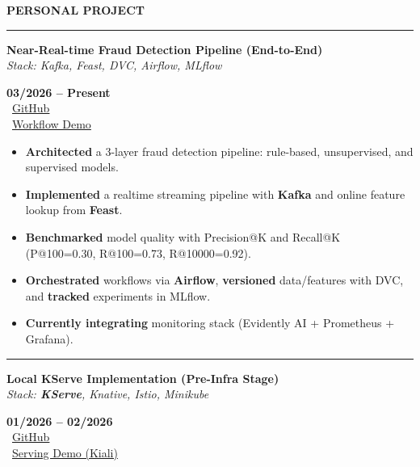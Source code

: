 \documentclass[a4paper,10pt]{extarticle}
\begin{document}
\vspace{2pt}

\noindent\textbf{PERSONAL PROJECT}\par\vspace{1pt}\hrule\vspace{2pt}
\noindent
\begin{minipage}[t]{0.73\textwidth}
    \textbf{Near-Real-time Fraud Detection Pipeline (End-to-End)} \\
    \textit{Stack: Kafka, Feast, DVC, Airflow, MLflow}
\end{minipage}
\hfill
\begin{minipage}[t]{0.24\textwidth}
    \begin{flushright}
    \small
    \textbf{03/2026 -- Present} \\
    \faGithub\ \href{https://github.com/tandat8896/fraud_rt_projects}{GitHub} \\
    \faYoutube\ \href{https://www.youtube.com/watch?v=AtsQwF9pSVg&list=PLRkwChN4lOmfjJLMB9fVPjxvJeA0QUNti}{Workflow Demo}
    \end{flushright}
\end{minipage}

\begin{itemize}
    \item \textbf{Architected} a 3-layer fraud detection pipeline: rule-based, unsupervised, and supervised models.
    \item \textbf{Implemented} a realtime streaming pipeline with \textbf{Kafka} and online feature lookup from \textbf{Feast}.
    \item \textbf{Benchmarked} model quality with Precision@K and Recall@K (P@100=0.30, R@100=0.73, R@10000=0.92).
    \item \textbf{Orchestrated} workflows via \textbf{Airflow}, \textbf{versioned} data/features with DVC, and \textbf{tracked} experiments in MLflow.
    \item \textbf{Currently integrating} monitoring stack (Evidently AI + Prometheus + Grafana).
\end{itemize}

\vspace{1pt}\hrule\vspace{2pt}
\noindent
\begin{minipage}[t]{0.73\textwidth}
    \textbf{Local KServe Implementation (Pre-Infra Stage)} \\
    \textit{Stack: \textbf{KServe}, Knative, Istio, Minikube}
\end{minipage}
\hfill
\begin{minipage}[t]{0.24\textwidth}
    \begin{flushright}
    \small
    \textbf{01/2026 -- 02/2026} \\
    \faGithub\ \href{https://github.com/tandat8896/sales-forecasting-end-to-end}{GitHub} \\
    \faYoutube\ \href{https://youtu.be/qJGMT12w4OE}{Serving Demo (Kiali)}
    \end{flushright}
\end{minipage}
\end{document}

